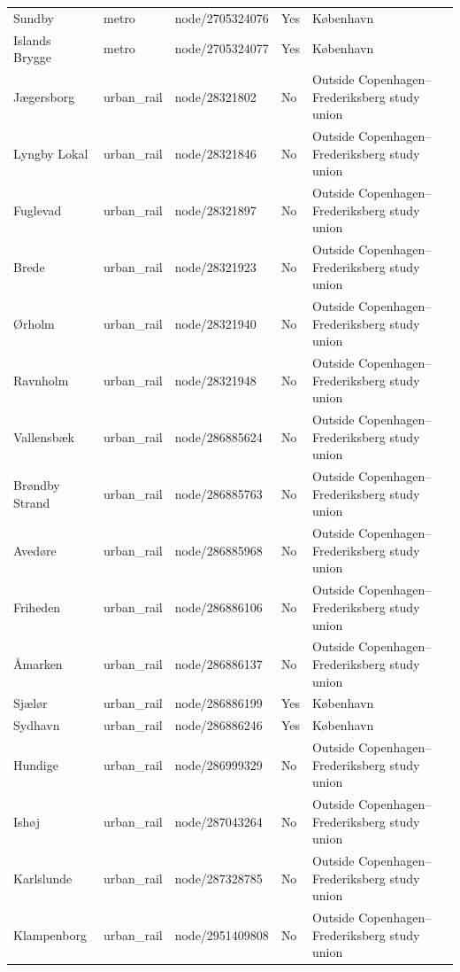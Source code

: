 \begin{landscape}
\begin{longtable}{>{\raggedright\arraybackslash}p{8.0cm}>{\raggedright\arraybackslash}p{2.4cm}>{\raggedright\arraybackslash}p{3.7cm}>{\raggedright\arraybackslash}p{1.5cm}>{\raggedright\arraybackslash}p{5.2cm}}
Sundby & metro & node/2705324076 & Yes & København \\
Islands Brygge & metro & node/2705324077 & Yes & København \\
Jægersborg & urban\_\allowbreak{}rail & node/28321802 & No & Outside Copenhagen--Frederiksberg study union \\
Lyngby Lokal & urban\_\allowbreak{}rail & node/28321846 & No & Outside Copenhagen--Frederiksberg study union \\
Fuglevad & urban\_\allowbreak{}rail & node/28321897 & No & Outside Copenhagen--Frederiksberg study union \\
Brede & urban\_\allowbreak{}rail & node/28321923 & No & Outside Copenhagen--Frederiksberg study union \\
Ørholm & urban\_\allowbreak{}rail & node/28321940 & No & Outside Copenhagen--Frederiksberg study union \\
Ravnholm & urban\_\allowbreak{}rail & node/28321948 & No & Outside Copenhagen--Frederiksberg study union \\
Vallensbæk & urban\_\allowbreak{}rail & node/286885624 & No & Outside Copenhagen--Frederiksberg study union \\
Brøndby Strand & urban\_\allowbreak{}rail & node/286885763 & No & Outside Copenhagen--Frederiksberg study union \\
Avedøre & urban\_\allowbreak{}rail & node/286885968 & No & Outside Copenhagen--Frederiksberg study union \\
Friheden & urban\_\allowbreak{}rail & node/286886106 & No & Outside Copenhagen--Frederiksberg study union \\
Åmarken & urban\_\allowbreak{}rail & node/286886137 & No & Outside Copenhagen--Frederiksberg study union \\
Sjælør & urban\_\allowbreak{}rail & node/286886199 & Yes & København \\
Sydhavn & urban\_\allowbreak{}rail & node/286886246 & Yes & København \\
Hundige & urban\_\allowbreak{}rail & node/286999329 & No & Outside Copenhagen--Frederiksberg study union \\
Ishøj & urban\_\allowbreak{}rail & node/287043264 & No & Outside Copenhagen--Frederiksberg study union \\
Karlslunde & urban\_\allowbreak{}rail & node/287328785 & No & Outside Copenhagen--Frederiksberg study union \\
Klampenborg & urban\_\allowbreak{}rail & node/2951409808 & No & Outside Copenhagen--Frederiksberg study union \\

\end{longtable}
\end{landscape}
